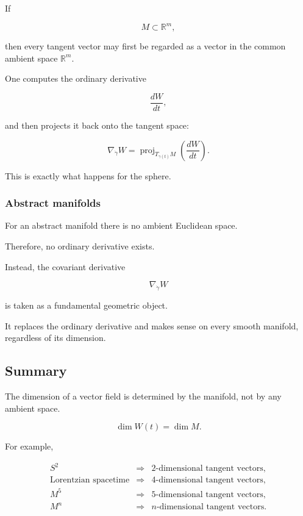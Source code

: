 \documentclass[12pt,a4paper]{article}
\theoremstyle{notespace}
\begin{document}
If

\[
M
\subset
\mathbb{R}^m,
\]

then every tangent vector may first be regarded as a vector in the common
ambient space \(\mathbb{R}^m\).

One computes the ordinary derivative

\[
\frac{dW}{dt},
\]

and then projects it back onto the tangent space:

\[
\boxed{
	\nabla_{\dot\gamma}W
	=
	\operatorname{proj}_{T_{\gamma(t)}M}
	\left(
	\frac{dW}{dt}
	\right).
}
\]

This is exactly what happens for the sphere.


\subsubsection*{Abstract manifolds}

For an abstract manifold there is no ambient Euclidean space.

Therefore, no ordinary derivative exists.

Instead, the covariant derivative

\[
\boxed{
	\nabla_{\dot\gamma}W
}
\]

is taken as a fundamental geometric object.

It replaces the ordinary derivative and makes sense on every smooth
manifold, regardless of its dimension.


\subsection{Summary}

The dimension of a vector field is determined by the manifold, not by any
ambient space.

\[
\boxed{
	\dim W(t)=\dim M.
}
\]

For example,

\[
\begin{array}{ccl}
	S^2 &\Rightarrow& 2\text{-dimensional tangent vectors},\\[1mm]
	\text{Lorentzian spacetime} &\Rightarrow& 4\text{-dimensional tangent vectors},\\[1mm]
	M^5 &\Rightarrow& 5\text{-dimensional tangent vectors},\\[1mm]
	M^n &\Rightarrow& n\text{-dimensional tangent vectors}.
\end{array}
\]
\end{document}
